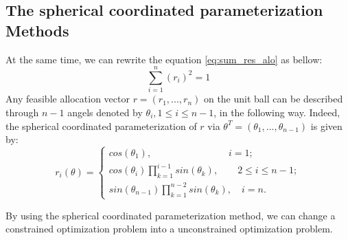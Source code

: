 \documentclass[a4paper,12pt]{article}
\begin{document}
\subsection{The spherical coordinated parameterization  Methods}
At the same time, we can rewrite the equation \ref{eq:sum_res_alo} as bellow:\\
\begin{equation} \label{eq:sum_res_alo_r_2}
\sum_{i=1}^{n} (r_i)^2 = 1
\end{equation}
Any feasible allocation vector $r = (r_1,...,r_n)$ on the unit ball can be described through $n-1$ angels denoted by $\theta_i, 1\leq i \leq n-1$, in the following way. Indeed, the spherical coordinated parameterization of $r$ via $\theta^T = (\theta_1,...,\theta_{n-1}) $ is given by:\\
\begin{equation}\label{eq:sphe}
    r_i(\theta)=\left\{
                \begin{array}{ll}
                  cos(\theta_1), \quad \quad \quad \quad \quad \quad \quad \quad i=1;\\
                  cos(\theta_i)\prod_{k=1}^{i-1} sin(\theta_k),\quad  \quad  2\leq i \leq n-1;\\
                  sin(\theta_{n-1})\prod_{k=1}^{n-2} sin(\theta_k),\quad  i=n.
                \end{array}
              \right.
\end{equation}

By using the spherical coordinated parameterization method, we can change a constrained optimization problem into a unconstrained optimization problem.\\
\end{document}
